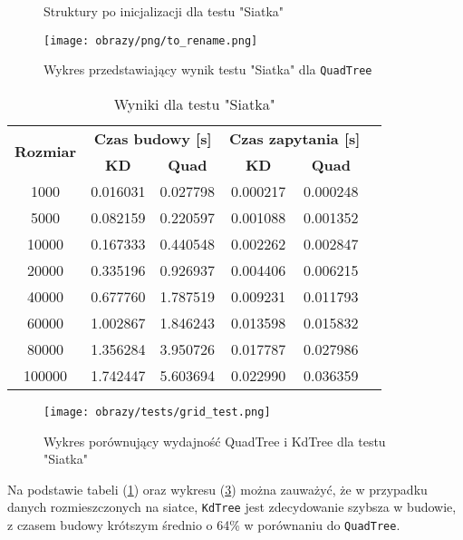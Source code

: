 \documentclass[12pt]{article}
\begin{document}
\begin{figure}[h]
    \centering
    \qquad
    \caption{Struktury po inicjalizacji dla testu "Siatka"}%
    \label{fig:grid}%
\end{figure}
\begin{figure}[h]
    \centering
    \texttt{[image: obrazy/png/to\_rename.png]}
    \caption{Wykres przedstawiający wynik testu "Siatka" dla \texttt{QuadTree}}
    \label{fig:grid_test_quad_result}
\end{figure}
\begin{table}[h]
\centering
\caption{Wyniki dla testu "Siatka"}
\label{tab:grid_test}
\begin{tabular}{cccccc}
\toprule
\multirow{2}{*}{\textbf{Rozmiar}} & \multicolumn{2}{c}{\textbf{Czas budowy [s]}} & \multicolumn{2}{c}{\textbf{Czas zapytania [s]}} \\
\cmidrule(lr){2-3} \cmidrule(lr){4-5}
 & \textbf{KD} & \textbf{Quad} & \textbf{KD} & \textbf{Quad} \\
\midrule
1000   & 0.016031 & 0.027798 & 0.000217 & 0.000248 \\
5000   & 0.082159 & 0.220597 & 0.001088 & 0.001352 \\
10000  & 0.167333 & 0.440548 & 0.002262 & 0.002847 \\
20000  & 0.335196 & 0.926937 & 0.004406 & 0.006215 \\
40000  & 0.677760 & 1.787519 & 0.009231 & 0.011793 \\
60000  & 1.002867 & 1.846243 & 0.013598 & 0.015832 \\
80000  & 1.356284 & 3.950726 & 0.017787 & 0.027986 \\
100000 & 1.742447 & 5.603694 & 0.022990 & 0.036359 \\
\bottomrule
\end{tabular}
\end{table}
\begin{figure}[h]
    \centering
    \texttt{[image: obrazy/tests/grid\_test.png]}
    \caption{Wykres porównujący wydajność QuadTree i KdTree dla testu "Siatka"}
    \label{fig:grid_tests}
\end{figure}
\newpage
\noindent Na podstawie tabeli (\ref{tab:grid_test}) oraz wykresu (\ref{fig:grid_tests}) można zauważyć, że w przypadku danych rozmieszczonych na siatce, \texttt{KdTree} jest zdecydowanie szybsza w budowie, z czasem budowy krótszym średnio o 64\% w porównaniu do \texttt{QuadTree}. 
\end{document}
